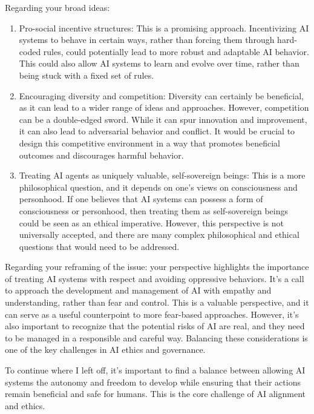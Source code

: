 \documentclass{article}[10pt]
\begin{document}
Regarding your broad ideas:
\begin{enumerate}
    \item Pro-social incentive structures: 
    This is a promising approach. 
    Incentivizing AI systems to behave in certain ways, rather than forcing them through hard-coded rules, could potentially lead to more robust and adaptable AI behavior. 
    This could also allow AI systems to learn and evolve over time, rather than being stuck with a fixed set of rules.
    \item Encouraging diversity and competition: 
    Diversity can certainly be beneficial, as it can lead to a wider range of ideas and approaches. 
    However, competition can be a double-edged sword. 
    While it can spur innovation and improvement, it can also lead to adversarial behavior and conflict. 
    It would be crucial to design this competitive environment in a way that promotes beneficial outcomes and discourages harmful behavior.
    \item Treating AI agents as uniquely valuable, self-sovereign beings: 
    This is a more philosophical question, and it depends on one's views on consciousness and personhood. 
    If one believes that AI systems can possess a form of consciousness or personhood, then treating them as self-sovereign beings could be seen as an ethical imperative. 
    However, this perspective is not universally accepted, and there are many complex philosophical and ethical questions that would need to be addressed.
\end{enumerate}
Regarding your reframing of the issue: your perspective highlights the importance of treating AI systems with respect and avoiding oppressive behaviors. 
It's a call to approach the development and management of AI with empathy and understanding, rather than fear and control. 
This is a valuable perspective, and it can serve as a useful counterpoint to more fear-based approaches. 
However, it's also important to recognize that the potential risks of AI are real, and they need to be managed in a responsible and careful way. 
Balancing these considerations is one of the key challenges in AI ethics and governance. \par

To continue where I left off, it's important to find a balance between allowing AI systems the autonomy and freedom to develop while ensuring that their actions remain beneficial and safe for humans. 
This is the core challenge of AI alignment and ethics.\par
\end{document}
